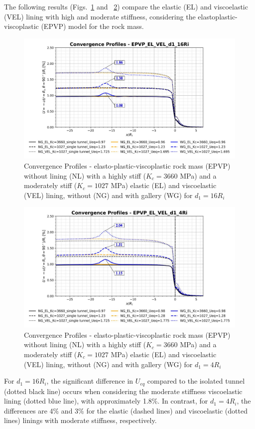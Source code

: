 \documentclass[a4paper,fleqn]{cas-sc}
\begin{document}
The following results (Figs.~\ref{EPVP_EL_VEL_d1_16Ri} and ~\ref{EPVP_EL_VEL_d1_4Ri}) compare the elastic (EL) and viscoelastic (VEL) lining with high and moderate stiffness, considering the elastoplastic-viscoplastic (EPVP) model for the rock mass. 
\begin{figure}[h!]
	\centering
	\includegraphics[scale=0.5]{Convergence Profiles - EPVP_EL_VEL_d1_16Ri.pdf}
	\caption{Convergence Profiles - elasto-plastic-viscoplastic rock mass (EPVP) without lining (NL) with a highly stiff ($K_c = 3660$ MPa) and a moderately stiff ($K_c = 1027$ MPa) elastic (EL) and viscoelastic (VEL) lining, without (NG) and with gallery (WG) for $d_1 = 16R_i$}
	\label{EPVP_EL_VEL_d1_16Ri}
\end{figure}
\FloatBarrier
\begin{figure}[h!]
	\centering
	\includegraphics[scale=0.5]{Convergence Profiles - EPVP_EL_VEL_d1_4Ri.pdf}
	\caption{Convergence Profiles - elasto-plastic-viscoplastic rock mass (EPVP) without lining (NL) with a highly stiff ($K_c = 3660$ MPa) and a moderately stiff ($K_c = 1027$ MPa) elastic (EL) and viscoelastic (VEL) lining, without (NG) and with gallery (WG) for $d_1 = 4R_i$}
	\label{EPVP_EL_VEL_d1_4Ri}
\end{figure}
\FloatBarrier
For $d_1=16R_i$, the significant difference in $U_{eq}$ compared to the isolated tunnel (dotted black line) occurs when considering the moderate stiffness viscoelastic lining (dotted blue line), with approximately 1.8\%. In contrast, for $d_1=4R_i$, the differences are 4\% and 3\% for the elastic (dashed lines) and viscoelastic (dotted lines) linings with moderate stiffness, respectively.
\end{document}
